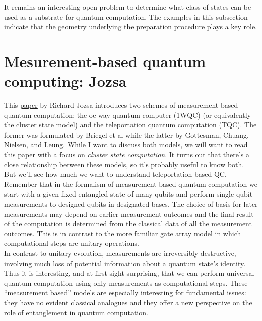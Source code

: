 \documentclass{book}
\theoremstyle{definition}
\begin{document}
It remains an interesting open problem to determine what class of states can be used as
a substrate for quantum computation. The examples in this subsection indicate that the
geometry underlying the preparation procedure plays a key role.
	



	
















\newpage

\section{Mesurement-based quantum computing: Jozsa}

This \href{https://arxiv.org/pdf/quant-ph/0508124.pdf}{\underline{paper}} by Richard Jozsa introduces two schemes of measurement-based quantum computation: the oe-way quantum computer (1WQC) (or equivalently the cluster state model) and the teleportation quantum computation (TQC).  The former was formulated by Briegel et al while the latter by Gottesman, Chuang, Nielsen, and Leung. While I want to discuss both models, we will want to read this paper with a focus on \textit{cluster state computation}. It turns out that there's a close relationship between these models, so it's probably useful to know both. But we'll see how much we want to understand teleportation-based QC. \\

Remember that in the formalism of measurement based quantum computation we start with a given fixed entangled state of many qubits and perform single-qubit measurements to designed qubits in designated bases. The choice of basis for later
measurements may depend on earlier measurement outcomes and the final result of the computation is determined from the classical data of all the measurement outcomes. This is in contrast to the more familiar gate array model in which computational steps are unitary operations.\\

In contrast to unitary evolution, measurements are irreversibly destructive, involving much loss of potential information about a quantum state’s identity. Thus it is interesting, and at first sight surprising, that we can perform universal quantum computation using only measurements
as computational steps. These ``measurement based'' models are especially interesting for fundamental issues: they have no evident classical analogues and they offer a new perspective on the role of entanglement in quantum computation. 
\end{document}

